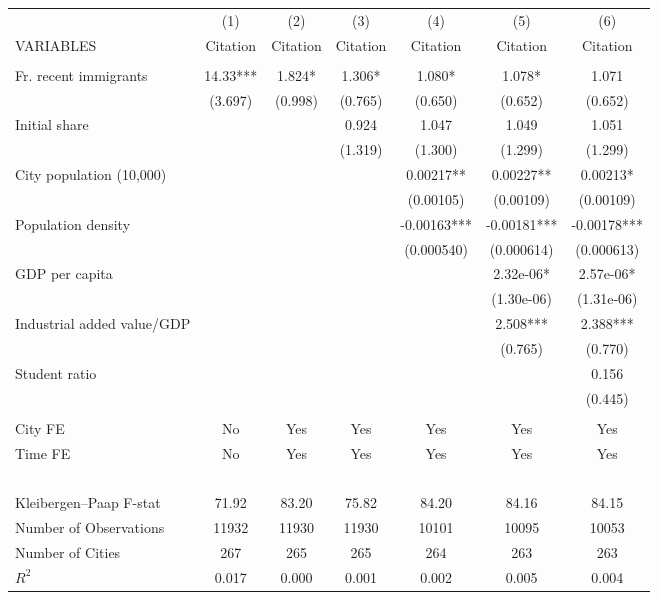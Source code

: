 \begin{tabular}{lcccccc} \hline
 & (1) & (2) & (3) & (4) & (5) & (6) \\
VARIABLES & Citation & Citation & Citation & Citation & Citation & Citation \\ \hline
 &  &  &  &  &  &  \\
Fr. recent immigrants & 14.33*** & 1.824* & 1.306* & 1.080* & 1.078* & 1.071 \\
 & (3.697) & (0.998) & (0.765) & (0.650) & (0.652) & (0.652) \\
Initial share &  &  & 0.924 & 1.047 & 1.049 & 1.051 \\
 &  &  & (1.319) & (1.300) & (1.299) & (1.299) \\
City population (10,000) &  &  &  & 0.00217** & 0.00227** & 0.00213* \\
 &  &  &  & (0.00105) & (0.00109) & (0.00109) \\
Population density &  &  &  & -0.00163*** & -0.00181*** & -0.00178*** \\
 &  &  &  & (0.000540) & (0.000614) & (0.000613) \\
GDP per capita &  &  &  &  & 2.32e-06* & 2.57e-06* \\
 &  &  &  &  & (1.30e-06) & (1.31e-06) \\
Industrial added value/GDP &  &  &  &  & 2.508*** & 2.388*** \\
 &  &  &  &  & (0.765) & (0.770) \\
Student ratio &  &  &  &  &  & 0.156 \\
 &  &  &  &  &  & (0.445) \\
 &  &  &  &  &  &  \\
City FE & No & Yes & Yes & Yes & Yes & Yes \\
Time FE & No & Yes & Yes & Yes & Yes & Yes \\
~ & ~ & ~ & ~ & ~ & ~ & ~ \\
Kleibergen–Paap F-stat & 71.92 & 83.20 & 75.82 & 84.20 & 84.16 & 84.15 \\
Number of Observations & 11932 & 11930 & 11930 & 10101 & 10095 & 10053 \\
Number of Cities & 267 & 265 & 265 & 264 & 263 & 263 \\
 $ R^2$ & 0.017 & 0.000 & 0.001 & 0.002 & 0.005 & 0.004 \\ \hline
\end{tabular}
